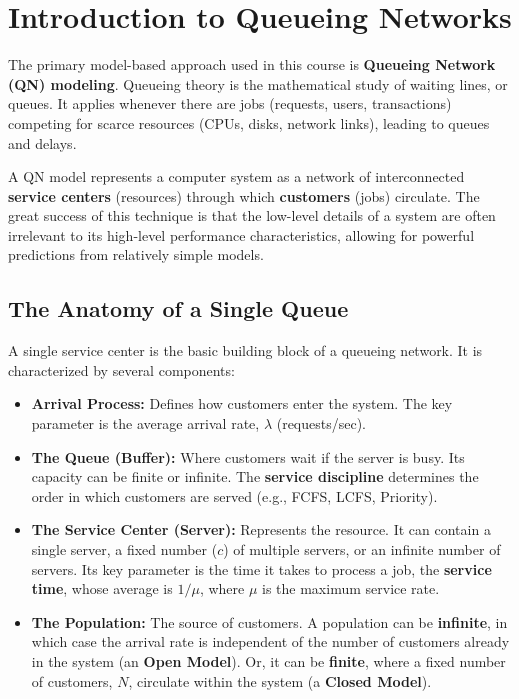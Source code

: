 \section{Introduction to Queueing Networks}
The primary model-based approach used in this course is \textbf{Queueing Network (QN) modeling}. Queueing theory is the mathematical study of waiting lines, or queues. It applies whenever there are jobs (requests, users, transactions) competing for scarce resources (CPUs, disks, network links), leading to queues and delays.

A QN model represents a computer system as a network of interconnected \textbf{service centers} (resources) through which \textbf{customers} (jobs) circulate. The great success of this technique is that the low-level details of a system are often irrelevant to its high-level performance characteristics, allowing for powerful predictions from relatively simple models.

\subsection{The Anatomy of a Single Queue}
A single service center is the basic building block of a queueing network. It is characterized by several components:
\begin{itemize}
    \item \textbf{Arrival Process:} Defines how customers enter the system. The key parameter is the average arrival rate, $\lambda$ (requests/sec).
    \item \textbf{The Queue (Buffer):} Where customers wait if the server is busy. Its capacity can be finite or infinite. The \textbf{service discipline} determines the order in which customers are served (e.g., FCFS, LCFS, Priority).
    \item \textbf{The Service Center (Server):} Represents the resource. It can contain a single server, a fixed number ($c$) of multiple servers, or an infinite number of servers. Its key parameter is the time it takes to process a job, the \textbf{service time}, whose average is $1/\mu$, where $\mu$ is the maximum service rate.
    \item \textbf{The Population:} The source of customers. A population can be \textbf{infinite}, in which case the arrival rate is independent of the number of customers already in the system (an \textbf{Open Model}). Or, it can be \textbf{finite}, where a fixed number of customers, $N$, circulate within the system (a \textbf{Closed Model}).
\end{itemize}

